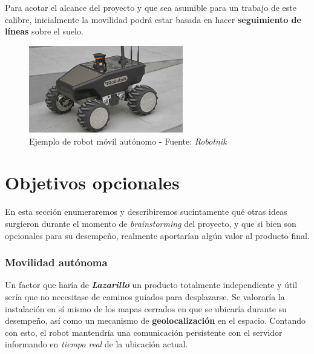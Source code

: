 Para acotar el alcance del proyecto y que sea asumible para un trabajo de este calibre, inicialmente la movilidad podrá estar basada en hacer \textbf{seguimiento de líneas} sobre el suelo.\\

\begin{figure}[h]
	\centering
	\includegraphics[width=0.6\textwidth]{imagenes/robotnik.jpg}
	\caption{Ejemplo de robot móvil autónomo - Fuente: \textit{Robotnik}}
\end{figure}


\section{Objetivos opcionales}

En esta sección enumeraremos y describiremos sucíntamente qué otras ideas surgieron durante el momento de \textit{brainstorming} del proyecto, y que si bien son opcionales para su desempeño, realmente aportarían algún valor al producto final.\\


\subsubsection{Movilidad autónoma}

Un factor que haría de \textbf{\textit{Lazarillo}} un producto totalmente independiente y útil sería que no necesitase de caminos guiados para desplazarse. Se valoraría la instalación en sí mismo de los mapas cerrados en que se ubicaría durante su desempeño, así como un mecanismo de \textbf{geolocalización} en el espacio. Contando con esto, el robot mantendría una comunicación persistente con el servidor informando en \textit{tiempo real} de la ubicación actual.\\






